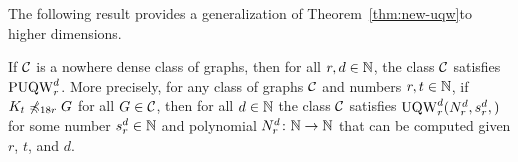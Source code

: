 	The following result provides a generalization of Theorem~\ref{thm:new-uqw}to higher dimensions.

\begin{theorem}[$\star$]\label{thm:uqw-tuples}If $\cal C$
	is a nowhere dense class of graphs,
	then for all $r,d\in\N$,
	the class $\cal C$ satisfies
	 $\puqw^d_r$.
	More precisely, for any class of graphs $\cal C$ and numbers $r,t\in\N$,
	if  	$K_t\not\minor_{18r} G$ for all $G\in \cal C$,
then for all $d\in \N$ the class $\cal C$ satisfies $\uqw^d_{r}(N^d_r,s^d_r,)$	for 
some number $s^d_r\in \N$ and polynomial $N^d_r\from \N\to\N$ that can be computed given $r$, $t$, and $d$.
\end{theorem}

